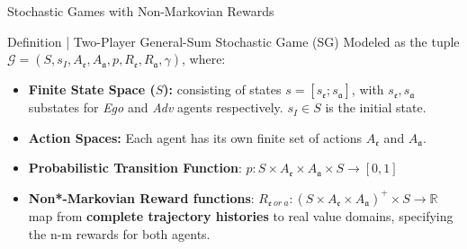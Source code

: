 \documentclass[10pt, aspectratio=169]{beamer}
\newcommand{\evidenzia}[1]{\textcolor{verdeSalvia}{\textbf{#1}}}
\begin{document}
\begin{frame}{Stochastic Games with Non-Markovian Rewards}
    \vspace{0.7cm}
    \begin{block}{Definition | Two-Player General-Sum Stochastic Game (SG)}
        \vspace{0.2cm}
        Modeled as the tuple $\mathcal{G}=(S,s_{I},A_{\mathfrak{e}},A_{\mathfrak{a}},p,R_{\mathfrak{e}},R_{\mathfrak{a}},\gamma)$, where:
        \begin{itemize}
            \item \textbf{Finite State Space ($S$):} consisting of states $s=[s_{\mathfrak{e}};s_{\mathfrak{a}}]$, with $s_{\mathfrak{e}}, s_{\mathfrak{a}}$ substates for \textit{Ego} and \textit{Adv} agents respectively. $s_{I}\in S$ is the initial state.%
            \item \textbf{Action Spaces:} Each agent has its own finite set of actions $A_{\mathfrak{e}}$ and $A_{\mathfrak{a}}$.
            \item \textbf{Probabilistic Transition Function}: $p:S\times A_{\mathfrak{e}}\times A_{\mathfrak{a}}\times S\rightarrow[0,1]$ %
            \item \textbf{Non*-Markovian Reward functions}: $R_{\mathfrak{e} \ or\ a} : (S\times A_{\mathfrak{e}}\times A_{\mathfrak{a}})^{+}\times S\rightarrow\mathbb{R}$ map from \evidenzia{complete trajectory histories} %
            to real value domains, specifying the n-m rewards for both agents.
        \end{itemize}
    \end{block}
    \vspace{0.2cm}{\footnotesize (*) Usual definition assumes system Markovianity.}
\end{frame}
\end{document}
